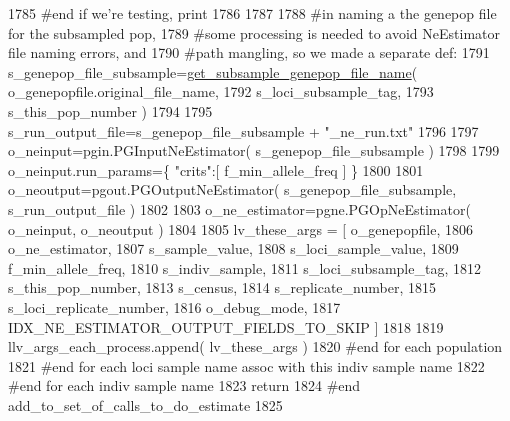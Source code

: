 \begin{DoxyCode}
1785                 \textcolor{comment}{#end if we're testing, print }
1786                 
1787 
1788                 \textcolor{comment}{#in naming a the genepop file for the subsampled pop,}
1789                 \textcolor{comment}{#some processing is needed to avoid NeEstimator file naming errors, and}
1790                 \textcolor{comment}{#path mangling, so we made a separate def:}
1791                 s\_genepop\_file\_subsample=\hyperlink{namespacenegui_1_1pgdriveneestimator_a9359fcbe384546efd152c8d06fec5aa5}{get\_subsample\_genepop\_file\_name}( 
      o\_genepopfile.original\_file\_name, 
1792                                                         s\_loci\_subsample\_tag, 
1793                                                         s\_this\_pop\_number )
1794 
1795                 s\_run\_output\_file=s\_genepop\_file\_subsample + \textcolor{stringliteral}{"\_ne\_run.txt"}
1796 
1797                 o\_neinput=pgin.PGInputNeEstimator( s\_genepop\_file\_subsample )
1798 
1799                 o\_neinput.run\_params=\{ \textcolor{stringliteral}{"crits"}:[ f\_min\_allele\_freq ]  \}
1800 
1801                 o\_neoutput=pgout.PGOutputNeEstimator( s\_genepop\_file\_subsample, s\_run\_output\_file ) 
1802 
1803                 o\_ne\_estimator=pgne.PGOpNeEstimator( o\_neinput, o\_neoutput ) 
1804                 
1805                 lv\_these\_args = [ o\_genepopfile,  
1806                                     o\_ne\_estimator, 
1807                                     s\_sample\_value, 
1808                                     s\_loci\_sample\_value,
1809                                     f\_min\_allele\_freq, 
1810                                     s\_indiv\_sample, 
1811                                     s\_loci\_subsample\_tag,
1812                                     s\_this\_pop\_number, 
1813                                     s\_census,
1814                                     s\_replicate\_number, 
1815                                     s\_loci\_replicate\_number,
1816                                     o\_debug\_mode,
1817                                     IDX\_NE\_ESTIMATOR\_OUTPUT\_FIELDS\_TO\_SKIP ]
1818 
1819                 llv\_args\_each\_process.append( lv\_these\_args )
1820             \textcolor{comment}{#end for each population}
1821         \textcolor{comment}{#end for each loci sample name assoc with this indiv sample name}
1822     \textcolor{comment}{#end for each indiv sample name}
1823     \textcolor{keywordflow}{return}
1824 \textcolor{comment}{#end add\_to\_set\_of\_calls\_to\_do\_estimate}
1825 
\end{DoxyCode}
